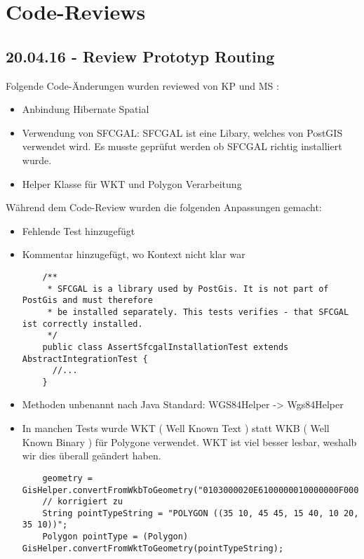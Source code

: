 \newpage
\chapter{Code-Reviews} 

\section{20.04.16 - Review Prototyp Routing}
Folgende Code-Änderungen wurden reviewed von KP und MS :
\begin{itemize}
	\item{Anbindung Hibernate Spatial}
	\item{Verwendung von SFCGAL: SFCGAL ist eine Libary, welches von PostGIS verwendet wird. Es musste geprüfut werden ob SFCGAL richtig installiert wurde.}
	\item{Helper Klasse für WKT und Polygon Verarbeitung}
\end{itemize}

Während dem Code-Review wurden die folgenden Anpassungen gemacht:
\begin{itemize}
	\item{Fehlende Test hinzugefügt}
	\item{Kommentar hinzugefügt, wo Kontext nicht klar war}
	\begin{lstlisting}
	/**
     * SFCGAL is a library used by PostGis. It is not part of PostGis and must therefore
     * be installed separately. This tests verifies - that SFCGAL ist correctly installed.
     */
    public class AssertSfcgalInstallationTest extends AbstractIntegrationTest {
      //...
    }
	\end{lstlisting}
	\item{Methoden unbenannt nach Java Standard: WGS84Helper -> Wgs84Helper }
	\item{In manchen Tests wurde WKT ( Well Known Text ) statt WKB ( Well Known Binary ) für Polygone verwendet. WKT ist viel besser lesbar, weshalb wir dies überall geändert haben.}
	\begin{lstlisting}
    geometry = GisHelper.convertFromWkbToGeometry("0103000020E6100000010000000F000000FFBE7D4109A2214002A052D59E9E9C4740");
    // korrigiert zu
    String pointTypeString = "POLYGON ((35 10, 45 45, 15 40, 10 20, 35 10))";
    Polygon pointType = (Polygon) GisHelper.convertFromWktToGeometry(pointTypeString);
	\end{lstlisting}
\end{itemize}
\newpage

